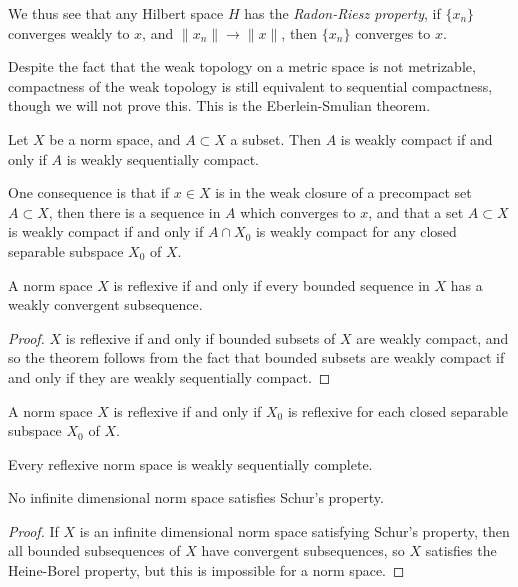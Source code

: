 We thus see that any Hilbert space $H$ has the \emph{Radon-Riesz property}, if $\{ x_n \}$ converges weakly to $x$, and $\| x_n \| \to \| x \|$, then $\{ x_n \}$ converges to $x$.

Despite the fact that the weak topology on a metric space is not metrizable, compactness of the weak topology is still equivalent to sequential compactness, though we will not prove this. This is the Eberlein-Smulian theorem.

\begin{theorem}
    Let $X$ be a norm space, and $A \subset X$ a subset. Then $A$ is weakly compact if and only if $A$ is weakly sequentially compact.
\end{theorem}

One consequence is that if $x \in X$ is in the weak closure of a precompact set $A \subset X$, then there is a sequence in $A$ which converges to $x$, and that a set $A \subset X$ is weakly compact if and only if $A \cap X_0$ is weakly compact for any closed separable subspace $X_0$ of $X$.

\begin{corollary}
    A norm space $X$ is reflexive if and only if every bounded sequence in $X$ has a weakly convergent subsequence.
\end{corollary}
\begin{proof}
    $X$ is reflexive if and only if bounded subsets of $X$ are weakly compact, and so the theorem follows from the fact that bounded subsets are weakly compact if and only if they are weakly sequentially compact.
\end{proof}

\begin{corollary}
    A norm space $X$ is reflexive if and only if $X_0$ is reflexive for each closed separable subspace $X_0$ of $X$.
\end{corollary}

\begin{corollary}
    Every reflexive norm space is weakly sequentially complete.
\end{corollary}

\begin{corollary}
    No infinite dimensional norm space satisfies Schur's property.
\end{corollary}
\begin{proof}
    If $X$ is an infinite dimensional norm space satisfying Schur's property, then all bounded subsequences of $X$ have convergent subsequences, so $X$ satisfies the Heine-Borel property, but this is impossible for a norm space.
\end{proof}


